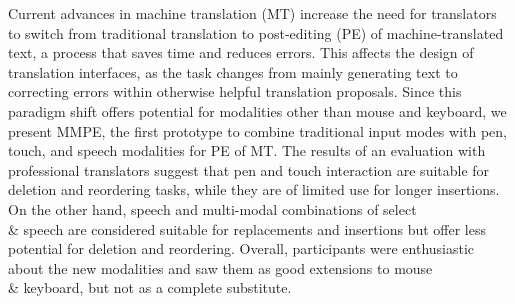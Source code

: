 Current advances in machine translation (MT) increase the need for translators to switch from traditional translation to post-editing (PE) of machine-translated text, a process that saves time and reduces errors. This affects the design of translation interfaces, as the task changes from mainly generating text to correcting errors within otherwise helpful translation proposals. Since this paradigm shift offers potential for modalities other than mouse and keyboard, we present MMPE, the first prototype to combine traditional input modes with pen, touch, and speech modalities for PE of MT. The results of an evaluation with professional translators suggest that pen and touch interaction are suitable for deletion and reordering tasks, while they are of limited use for longer insertions. On the other hand, speech and multi-modal combinations of select \\& speech are considered suitable for replacements and insertions but offer less potential for deletion and reordering. Overall, participants were enthusiastic about the new modalities and saw them as good extensions to mouse \\& keyboard, but not as a complete substitute.
